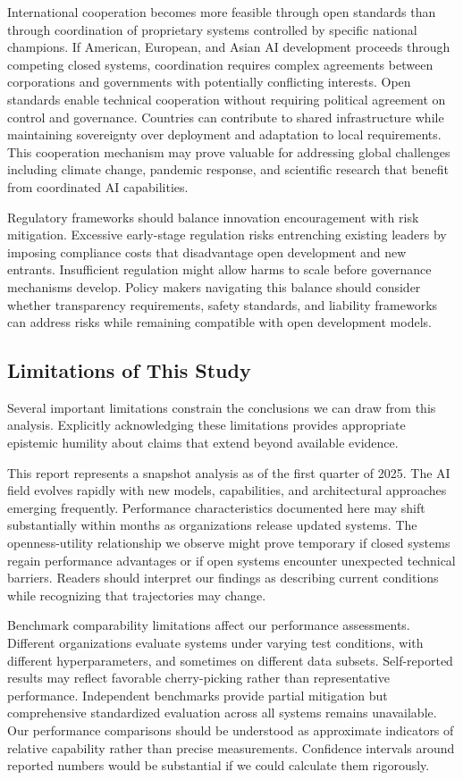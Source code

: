 International cooperation becomes more feasible through open standards than through coordination of proprietary systems controlled by specific national champions. If American, European, and Asian AI development proceeds through competing closed systems, coordination requires complex agreements between corporations and governments with potentially conflicting interests. Open standards enable technical cooperation without requiring political agreement on control and governance. Countries can contribute to shared infrastructure while maintaining sovereignty over deployment and adaptation to local requirements. This cooperation mechanism may prove valuable for addressing global challenges including climate change, pandemic response, and scientific research that benefit from coordinated AI capabilities.

Regulatory frameworks should balance innovation encouragement with risk mitigation. Excessive early-stage regulation risks entrenching existing leaders by imposing compliance costs that disadvantage open development and new entrants. Insufficient regulation might allow harms to scale before governance mechanisms develop. Policy makers navigating this balance should consider whether transparency requirements, safety standards, and liability frameworks can address risks while remaining compatible with open development models.

\subsection{Limitations of This Study}

Several important limitations constrain the conclusions we can draw from this analysis. Explicitly acknowledging these limitations provides appropriate epistemic humility about claims that extend beyond available evidence.

This report represents a snapshot analysis as of the first quarter of 2025. The AI field evolves rapidly with new models, capabilities, and architectural approaches emerging frequently. Performance characteristics documented here may shift substantially within months as organizations release updated systems. The openness-utility relationship we observe might prove temporary if closed systems regain performance advantages or if open systems encounter unexpected technical barriers. Readers should interpret our findings as describing current conditions while recognizing that trajectories may change.

Benchmark comparability limitations affect our performance assessments. Different organizations evaluate systems under varying test conditions, with different hyperparameters, and sometimes on different data subsets. Self-reported results may reflect favorable cherry-picking rather than representative performance. Independent benchmarks provide partial mitigation but comprehensive standardized evaluation across all systems remains unavailable. Our performance comparisons should be understood as approximate indicators of relative capability rather than precise measurements. Confidence intervals around reported numbers would be substantial if we could calculate them rigorously.

